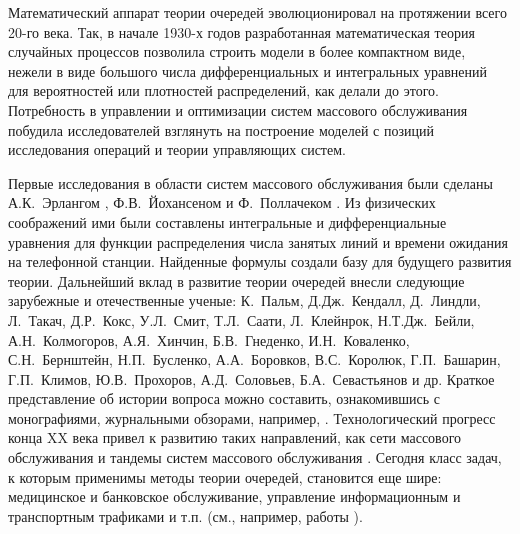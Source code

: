 Математический аппарат теории очередей эволюционировал на протяжении всего 20-го века. Так, в начале 1930-х годов разработанная математическая теория случайных процессов позволила строить модели в более компактном виде, нежели в виде большого числа дифференциальных и интегральных уравнений для вероятностей или плотностей распределений, как делали до этого. Потребность в управлении и оптимизации систем массового обслуживания побудила исследователей взглянуть на построение моделей с позиций исследования операций и теории управляющих систем.


Первые исследования в области систем массового обслуживания были сделаны  А.К.~Эрлангом \cite{Erlang:1909,Erlang:1917}, Ф.В.~Йохансеном \cite{Johannsen} и Ф.~Поллачеком \cite{Pollaczek:1934}. Из физических соображений ими были составлены интегральные и дифференциальные уравнения для функции распределения числа занятых линий  и времени  ожидания на телефонной станции. Найденные формулы создали базу для будущего развития теории. Дальнейший вклад в развитие теории очередей внесли следующие зарубежные и отечественные ученые: К.~Пальм, Д.Дж.~Кендалл, Д.~Линдли, Л.~Такач, Д.Р.~Кокс, У.Л.~Смит, Т.Л.~Саати, Л.~Клейнрок,  Н.Т.Дж.~Бейли,  А.Н.~Колмогоров, А.Я.~Хинчин, Б.В.~Гнеденко, И.Н.~Коваленко,  С.Н.~Бернштейн, Н.П.~Бусленко, А.А.~Боровков, В.С.~Королюк, Г.П.~Башарин, Г.П.~Климов, Ю.В.~Прохоров, А.Д.~Соловьев,  Б.А.~Севастьянов и др. Краткое представление об истории вопроса можно составить, ознакомившись с монографиями, журнальными обзорами, например, \cite{Borovkov, Bocharov:1995, GnedenkoKovalenko, KoksSmith, Kovalenko:1963, asmussen, kalashnikov}. Технологический прогресс конца XX века привел к развитию таких направлений, как сети массового обслуживания и тандемы систем массового обслуживания \cite{ivnickii, jackson, reich,Saratov}. Сегодня класс задач, к которым применимы методы теории очередей, становится еще шире: медицинское и банковское обслуживание, управление информационным и транспортным трафиками и т.п. (см., например, работы \cite{dudin:2011, farhadov, Haight:1963, haidemann, raghavan, rogiest}).
 
